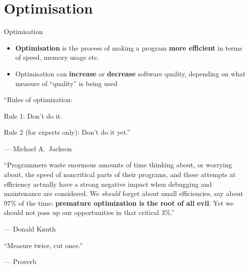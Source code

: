 \part{Optimisation}
\frame{\partpage}

\begin{frame}{Optimisation}
	\begin{itemize}
		\pause\item \textbf{Optimisation} is the process of making a program \textbf{more efficient}
			in terms of speed, memory usage etc. 
        \pause\item Optimisation can \textbf{increase} or \textbf{decrease} software quality,
            depending on what measure of ``quality'' is being used
    \end{itemize}
\end{frame}

\begin{frame}
	\begin{center}
		``Rules of optimization:
		
		Rule 1: Don't do it.
		
		Rule 2 (for experts only): Don't do it yet.''
	\end{center}
	\begin{flushright}
		--- Michael A.\ Jackson
	\end{flushright}
\end{frame}

\begin{frame}
	\begin{center}
		``Programmers waste enormous amounts of time thinking about, or worrying about,
		the speed of noncritical parts of their programs, and these attempts at efficiency
		actually have a strong negative impact when debugging and maintenance are considered.
		We \textit{should} forget about small efficiencies, say about 97\% of the time:
		\textbf{premature optimization is the root of all evil}.
		Yet we should not pass up our opportunities in that critical 3\%.''
	\end{center}
	\begin{flushright}
		--- Donald Knuth
	\end{flushright}
\end{frame}

\begin{frame}
	\begin{center}
		``Measure twice, cut once.''
	\end{center}
	\begin{flushright}
		--- Proverb
	\end{flushright}
\end{frame}

